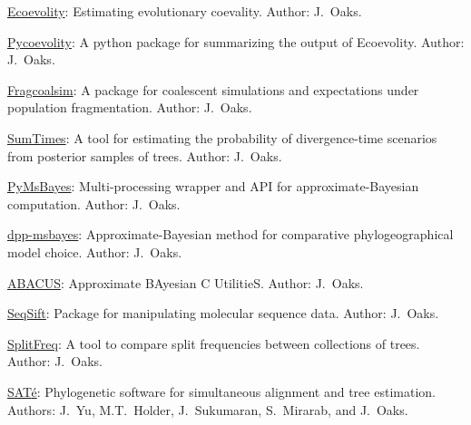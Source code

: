 \myHangIndent
\href{https://github.com/phyletica/ecoevolity}{Ecoevolity}:
    Estimating evolutionary coevality.
    Author: J.\ Oaks.

\myHangIndent
\href{https://github.com/phyletica/sumcoevolity}{Pycoevolity}:
    A python package for summarizing the output of Ecoevolity.
    Author: J.\ Oaks.

\myHangIndent
\href{https://github.com/joaks1/fragcoalsim}{Fragcoalsim}:
    A package for coalescent simulations and expectations under population
    fragmentation.
    Author: J.\ Oaks.

\myHangIndent
\href{https://github.com/phyletica/SumTimes}{SumTimes}:
    A tool for estimating the probability of divergence-time scenarios from
    posterior samples of trees.
    Author: J.\ Oaks.

\myHangIndent
\href{https://github.com/joaks1/PyMsBayes}{PyMsBayes}:
    Multi-processing wrapper and API for approximate-Bayesian
    computation.
    Author: J.\ Oaks.

\myHangIndent
\href{https://github.com/joaks1/dpp-msbayes}{dpp-msbayes}:
    Approximate-Bayesian method for comparative phylogeographical model choice.
    Author: J.\ Oaks.

\myHangIndent
\href{https://github.com/joaks1/abacus}{ABACUS}:
    Approximate BAyesian C UtilitieS.
    Author: J.\ Oaks.

\myHangIndent
\href{https://github.com/joaks1/SeqSift}{SeqSift}:
    Package for manipulating molecular sequence data.
    Author: J.\ Oaks.

\myHangIndent
\href{https://github.com/joaks1/SplitFreq}{SplitFreq}:
    A tool to compare split frequencies between collections of trees.
    Author: J.\ Oaks.

\myHangIndent
\href{http://phylo.bio.ku.edu/software/sate/sate.html}{{SAT}\'{e}}:
    Phylogenetic software for simultaneous alignment and tree estimation.
    Authors: J.\ Yu, M.T.\ Holder, J.\ Sukumaran, S.\ Mirarab, and J.\ Oaks.
